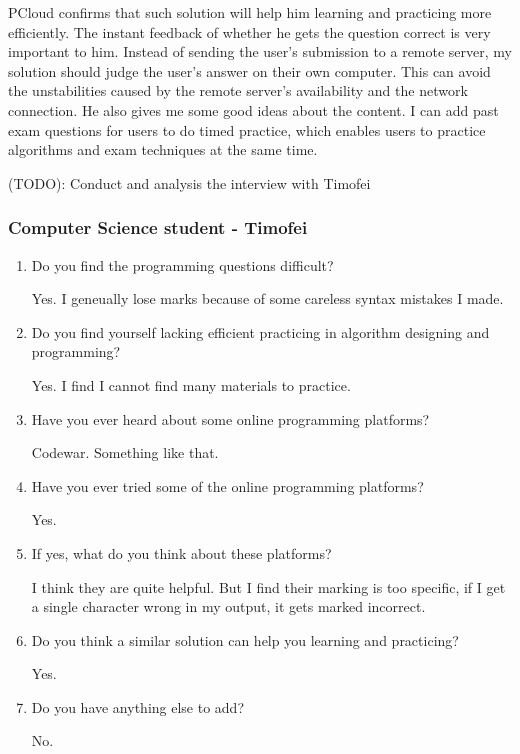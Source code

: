 \documentclass[a4paper]{report}
\begin{document}
PCloud confirms that such solution will help him learning and practicing more efficiently. The instant feedback of whether he gets the question correct is very important to him. Instead of sending the user's submission to a remote server, my solution should judge the user's answer on their own computer. This can avoid the unstabilities caused by the remote server's availability and the network connection. He also gives me some good ideas about the content. I can add past exam questions for users to do timed practice, which enables users to practice algorithms and exam techniques at the same time.

(TODO): Conduct and analysis the interview with Timofei

\subsubsection{Computer Science student - Timofei}

\begin{enumerate}

    \item Do you find the programming questions difficult?

    Yes. I geneually lose marks because of some careless syntax mistakes I made.

    \item Do you find yourself lacking efficient practicing in algorithm designing and programming?

    Yes. I find I cannot find many materials to practice.

    \item Have you ever heard about some online programming platforms?

    Codewar. Something like that.

    \item Have you ever tried some of the online programming platforms?

    Yes.

    \item If yes, what do you think about these platforms?

    I think they are quite helpful. But I find their marking is too specific, if I get a single character wrong in my output, it gets marked incorrect. 

    \item Do you think a similar solution can help you learning and practicing?

    Yes.

    \item Do you have anything else to add?

    No.

\end{enumerate}
\end{document}
